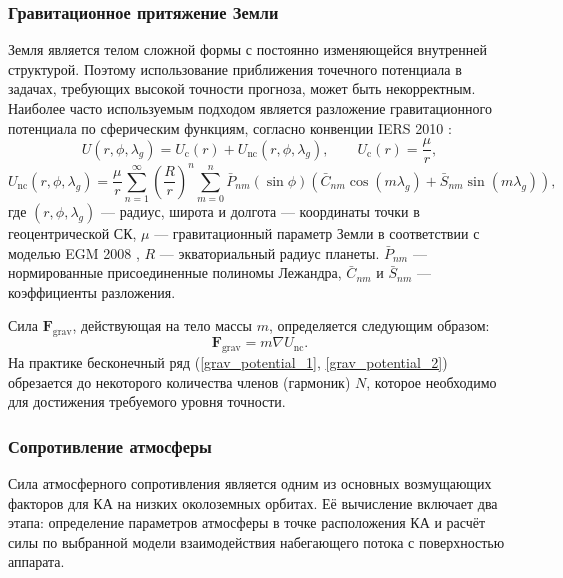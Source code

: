 \subsubsection{Гравитационное притяжение Земли}
Земля является телом сложной формы с постоянно изменяющейся внутренней структурой. Поэтому использование приближения точечного потенциала в задачах, требующих высокой точности прогноза, может быть некорректным. Наиболее часто используемым подходом является разложение гравитационного потенциала по сферическим функциям, согласно конвенции IERS 2010 \cite{petit20122010}:
\begin{equation}
    U(r, \phi, \lambda_g) = U_{\text{c}}(r) + U_{\text{nc}}(r, \phi, \lambda_g), \quad \quad
    U_{\text{c}}(r) = \frac{\mu}{r},
\label{grav_potential_1}
\end{equation}
\begin{equation}
    U_{\text{nc}}(r, \phi, \lambda_g) = \frac{\mu}{r} \sum_{n=1}^{\infty} \left(\frac{R}{r}\right)^{n} \sum_{m=0}^{n} \bar{P}_{nm} \left( \sin{\phi} \right) \left(\bar{C}_{nm}\cos{(m\lambda_g)} + \bar{S}_{nm} \sin{(m\lambda_g)} \right),
\label{grav_potential_2}
\end{equation}
где $(r, \phi, \lambda_g)$ --- радиус, широта и долгота --- координаты точки в геоцентрической СК, $\mu$ --- гравитационный параметр Земли в соответствии с моделью EGM 2008 \cite{pavlis2012development}, $R$ --- экваториальный радиус планеты. $\bar P_{nm}$ --- нормированные присоединенные полиномы Лежандра, $\bar{C}_{nm}$ и $\bar{S}_{nm}$ --- коэффициенты разложения.

Сила $\mathbf{F}_{\text{grav}}$, действующая на тело массы $m$, определяется следующим образом:
\begin{equation*}
    \mathbf{F}_{\text{grav}} = m \nabla U_{\text{nc}}.
\end{equation*}
На практике бесконечный ряд (\ref{grav_potential_1}, \ref{grav_potential_2}) обрезается до некоторого количества членов (гармоник) $N$, которое необходимо для достижения требуемого уровня точности.

\subsubsection{Сопротивление атмосферы}
Сила атмосферного сопротивления является одним из основных возмущающих факторов для КА на низких околоземных орбитах. Её вычисление включает два этапа: определение параметров атмосферы в точке расположения КА и расчёт силы по выбранной модели взаимодействия набегающего потока с поверхностью аппарата.

